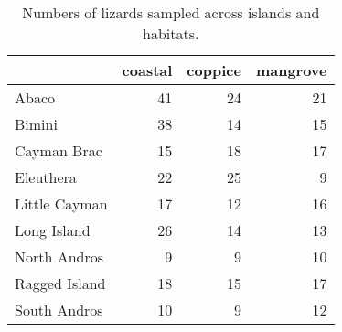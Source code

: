 \begin{table}[H]
    \caption{Numbers of lizards sampled across islands and habitats.}
    \centering
    \begin{tabular}{lrrr}
        \hline
        & coastal & coppice & mangrove\\
        \hline
        Abaco & 41 & 24 & 21\\
        Bimini & 38 & 14 & 15\\
        Cayman Brac & 15 & 18 & 17\\
        Eleuthera & 22 & 25 & 9\\
        Little Cayman & 17 & 12 & 16\\
        Long Island & 26 & 14 & 13\\
        North Andros & 9 & 9 & 10\\
        Ragged Island & 18 & 15 & 17\\
        South Andros & 10 & 9 & 12\\
        \hline
    \end{tabular}
    \label{suptab:counts}
\end{table}